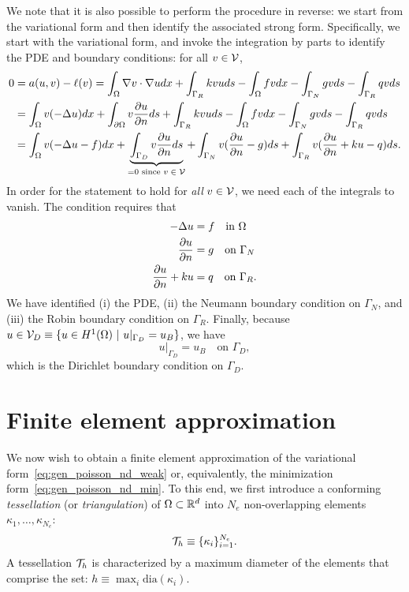 We note that it is also possible to perform the procedure in reverse: we start from the variational form and then identify the associated strong form. Specifically, we start with the variational form, and invoke the integration by parts to identify the PDE and boundary conditions: for all $v \in \mathcal{V}$,
\begin{align*}
  0 &=
  a(u,v) - \ell(v)
  =
  \int_\Omega \nabla v \cdot \nabla u dx + \int_{\Gamma_R} k vu ds
  - \int_\Omega fv dx - \int_{\Gamma_N} gv ds - \int_{\Gamma_R} qv ds
  \\
  &= \int_\Omega v (-\Delta u) dx + \int_{\partial \Omega} v \frac{\partial u}{\partial n} ds
  + \int_{\Gamma_R} k vu ds
  - \int_\Omega fv dx - \int_{\Gamma_N} gv ds - \int_{\Gamma_R} qv ds
  \\
  &=
  \int_\Omega v(-\Delta u - f) dx
  + \underbrace{\int_{\Gamma_D} v \frac{\partial u}{\partial n} ds}_{=0 \text{ since $v \in \mathcal{V}$}}
  + \int_{\Gamma_N} v (\frac{\partial u}{\partial n} - g) ds
  + \int_{\Gamma_R} v (\frac{\partial u}{\partial n} + ku - q) ds.
\end{align*}
In order for the statement to hold for \emph{all} $v \in \mathcal{V}$, we need each of the integrals to vanish.  The condition requires that
\begin{align*}
  -\Delta u &= f \quad \text{in } \Omega \\
  \frac{\partial u}{\partial n} &= g \quad \text{on } \Gamma_N \\
  \frac{\partial u}{\partial n} + ku &= q \quad \text{on } \Gamma_R.
\end{align*}
We have identified (i) the PDE, (ii) the Neumann boundary condition on $\Gamma_N$, and (iii) the Robin boundary condition on $\Gamma_R$.  Finally, because $u \in \mathcal{V}_D \equiv \{ u \in H^1(\Omega) \ | \ u|_{\Gamma_D} = u_B \}$, we have
\begin{equation*}
  u|_{\Gamma_D} = u_B \quad \text{on } \Gamma_D,
\end{equation*}
which is the Dirichlet boundary condition on $\Gamma_D$.

\section{Finite element approximation}
We now wish to obtain a finite element approximation of the variational form~\eqref{eq:gen_poisson_nd_weak} or, equivalently, the minimization form~\eqref{eq:gen_poisson_nd_min}. To this end, we first introduce a conforming \emph{tessellation} (or \emph{triangulation}) of $\Omega \subset \mathbb{R}^d$ into $N_e$ non-overlapping elements $\kappa_1, \dots, \kappa_{N_e}$:
\begin{equation*}
  \mathcal{T}_h \equiv \{ \kappa_i \}_{i=1}^{N_e}.
\end{equation*}
A tessellation $\mathcal{T}_h$ is characterized by a maximum diameter of the elements that comprise the set: $h \equiv \max_{i} \text{dia}(\kappa_i)$.

